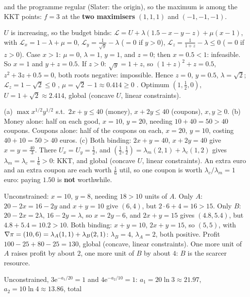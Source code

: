 \begin{solutions}
        and the programme regular (Slater: the origin), so the maximum is
        among the KKT points: $f=3$ at the \textbf{two maximisers}
        $(1,1,1)$ and $(-1,-1,-1)$.
  \item $U$ is increasing, so the budget binds:
        $\mathcal{L}=U+\lambda(1.5-x-y-z)+\mu(x-1)$, with
        $\mathcal{L}_x=1-\lambda+\mu=0$, $\mathcal{L}_y=\tfrac1{\sqrt y}-\lambda$
        ($=0$ if $y>0$), $\mathcal{L}_z=\tfrac1{1+z}-\lambda\le0$ ($=0$ if
        $z>0$). Case $x>1$: $\mu=0$, $\lambda=1$, $y=1$, and $z=0$; then
        $x=0.5<1$: infeasible. So $x=1$ and $y+z=0.5$. If $z>0$:
        $\sqrt y=1+z$, so $(1+z)^{2}+z=0.5$, $z^{2}+3z+0.5=0$, both roots
        negative: impossible. Hence $z=0$, $y=0.5$, $\lambda=\sqrt2$;
        $\mathcal{L}_z=1-\sqrt2\le0$ \checkmark, $\mu=\sqrt2-1\approx0.414\ge0$
        \checkmark. Optimum $(1,\tfrac12,0)$, $U=1+\sqrt2\approx2.414$,
        global (concave $U$, linear constraints).
  \item (a) $\max x^{1/2}y^{1/2}$ s.t.\ $2x+y\le40$ (money), $x+2y\le40$
        (coupons), $x,y\ge0$. (b) Money alone: half on each good,
        $x=10$, $y=20$, needing $10+40=50>40$ coupons. Coupons alone: half
        of the coupons on each, $x=20$, $y=10$, costing $40+10=50>40$ euros.
        (c) Both binding: $2x+y=40$, $x+2y=40$ give $x=y=\tfrac{40}3$. There
        $U_x=U_y=\tfrac12$, and
        $(\tfrac12,\tfrac12)=\lambda_m(2,1)+\lambda_c(1,2)$ gives
        $\lambda_m=\lambda_c=\tfrac16>0$: KKT, and global (concave $U$,
        linear constraints). An extra euro and an extra coupon are each
        worth $\tfrac16$ util, so one coupon is worth
        $\lambda_c/\lambda_m=1$ euro: paying $1.50$ is \textbf{not}
        worthwhile.
  \item Unconstrained: $x=10$, $y=8$, needing $18>10$ units of $A$. Only
        $A$: $20-2x=16-2y$ and $x+y=10$ give $(6,4)$, but $2\cdot6+4=16>15$.
        Only $B$: $20-2x=2\lambda$, $16-2y=\lambda$, so $x=2y-6$, and
        $2x+y=15$ gives $(4.8,5.4)$, but $4.8+5.4=10.2>10$. Both binding:
        $x+y=10$, $2x+y=15$, so $(5,5)$, with $\nabla\pi=(10,6)
        =\lambda_A(1,1)+\lambda_B(2,1)$: $\lambda_B=4$, $\lambda_A=2$, both
        positive. Profit $100-25+80-25=130$, global (concave, linear
        constraints). One more unit of $A$ raises profit by about $2$, one
        more unit of $B$ by about $4$: $B$ is the scarcer resource.
  \item Unconstrained, $3\mathrm{e}^{-a_1/20}=1$ and $4\mathrm{e}^{-a_2/10}=1$:
        $a_1=20\ln3\approx21.97$, $a_2=10\ln4\approx13.86$, total

\end{solutions}
